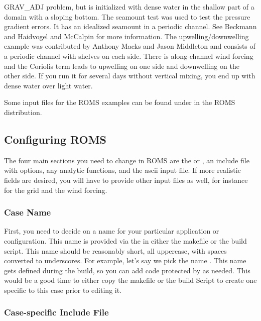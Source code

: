 \begin{klist}
 GRAV\_ADJ problem, but is initialized with dense water in the shallow
part of a domain with a sloping bottom.
      The seamount test was used to test the pressure
 gradient errors.  It has an idealized seamount in a periodic channel.
 See Beckmann and Haidvogel \cite{BH93} and McCalpin \cite{McCalpin94}
 for more information.
     The upwelling/downwelling example was
 contributed by Anthony Macks and Jason Middleton \cite{Macks93}
 and consists of a periodic channel with shelves on each side.
 There is along-channel wind forcing and the Coriolis term leads
 to upwelling on one side and downwelling on the other side. If
 you run it for several days without vertical mixing, you end up with
 dense water over light water.
\end{klist}
Some input files for the ROMS examples can be found under 
in the ROMS distribution.

\subsection{Configuring ROMS}
\label{User}

The four main sections you need to change in ROMS are the 
or , an include file with  options, any
analytic functions, and the ascii input file. If more realistic fields
are desired, you will have to provide other input files as well, for
instance for the grid and the wind forcing.

\subsubsection{Case Name}

First, you need to decide on a name for your particular application or
configuration. This name is provided via the  in
either the makefile or the build script. This name should be reasonably
short, all uppercase, with spaces converted to underscores. For example,
let's say we pick the name . This name gets defined
during the build, so you can add code protected by  as needed. This would be a good time to either copy the
makefile or the build Script to create one specific to this case prior
to editing it.

\subsubsection{ Case-specific Include File}

